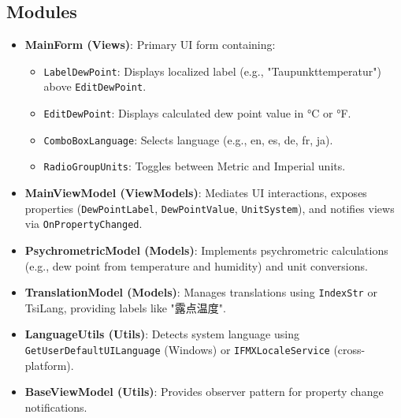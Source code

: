 \documentclass[12pt,a4paper]{article}
\begin{document}
	\subsection{Modules}
	\begin{itemize}
		\item \textbf{MainForm (Views)}: Primary UI form containing:
		\begin{itemize}
			\item \texttt{LabelDewPoint}: Displays localized label (e.g., "Taupunkttemperatur") above \texttt{EditDewPoint}.
			\item \texttt{EditDewPoint}: Displays calculated dew point value in °C or °F.
			\item \texttt{ComboBoxLanguage}: Selects language (e.g., en, es, de, fr, ja).
			\item \texttt{RadioGroupUnits}: Toggles between Metric and Imperial units.
		\end{itemize}
		\item \textbf{MainViewModel (ViewModels)}: Mediates UI interactions, exposes properties (\texttt{DewPointLabel}, \texttt{DewPointValue}, \texttt{UnitSystem}), and notifies views via \texttt{OnPropertyChanged}.
		\item \textbf{PsychrometricModel (Models)}: Implements psychrometric calculations (e.g., dew point from temperature and humidity) and unit conversions.
		\item \textbf{TranslationModel (Models)}: Manages translations using \texttt{IndexStr} or TsiLang, providing labels like "露点温度".
		\item \textbf{LanguageUtils (Utils)}: Detects system language using \texttt{GetUserDefaultUILanguage} (Windows) or \texttt{IFMXLocaleService} (cross-platform).
		\item \textbf{BaseViewModel (Utils)}: Provides observer pattern for property change notifications.
	\end{itemize}
	
\end{document}
